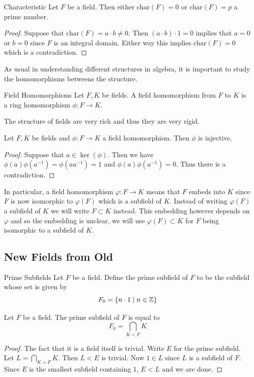 \documentclass[a4paper]{article}
\begin{document}
\begin{prp}{Characteristic}{} Let $F$ be a field. Then either $\text{char}(F)=0$ or $\text{char}(F)=p$ a prime number. 
\begin{proof}
Suppose that $\text{char}(F)=a\cdot b\neq 0$. Then $(a\cdot b)\cdot 1=0$ implies that $a=0$ or $b=0$ since $F$ is an integral domain. Either way this implies $\text{char}(F)=0$ which is a contradiction. 
\end{proof}
\end{prp}

As usual in understanding different structures in algebra, it is important to study the homomorphisms betweens the structure. 

\begin{defn}{Field Homomorphisms}{} Let $F,K$ be fields. A field homomorphism from $F$ to $K$ is a ring homomorphism $\phi:F\to K$. 
\end{defn}

The structure of fields are very rich and thus they are very rigid. 

\begin{lmm}{}{} Let $F,K$ be fields and $\phi:F\to K$ a field homomorphism. Then $\phi$ is injective. 
\begin{proof}
Suppose that $a\in\ker(\phi)$. Then we have $\phi(a)\phi(a^{-1})=\phi(aa^{-1})=1$ and $\phi(a)\phi(a^{-1})=0$. Thus there is a contradiction. 
\end{proof}
\end{lmm}

In particular, a field homomorphism $\varphi:F\to K$ means that $F$ embeds into $K$ since $F$ is now isomorphic to $\varphi(F)$ which is a subfield of $K$. Instead of writing $\varphi(F)$ a subfield of $K$ we will write $F\subset K$ instead. This embedding however depends on $\varphi$ and so the embedding is unclear, we will use $\varphi(F)\subset K$ for $F$ being isomorphic to a subfield of $K$. 

\subsection{New Fields from Old}
\begin{defn}{Prime Subfields}{} Let $F$ be a field. Define the prime subfield of $F$ to be the subfield whose set is given by $$F_0=\{n\cdot 1\;|\;n\in\mathbb{Z}\}$$
\end{defn}

\begin{prp}{}{} Let $F$ be a field. The prime subfield of $F$ is equal to $$F_0=\bigcap_{K<F}K$$ 
\begin{proof}
The fact that it is a field itself is trivial. Write $E$ for the prime subfield. Let $L=\bigcap_{K<F}K$.  Then $L<E$ is trivial. Now $1\in L$ since $L$ is a subfield of $F$. Since $E$ is the smallest subfield containing $1$, $E<L$ and we are done. 
\end{proof}
\end{prp}
\end{document}
